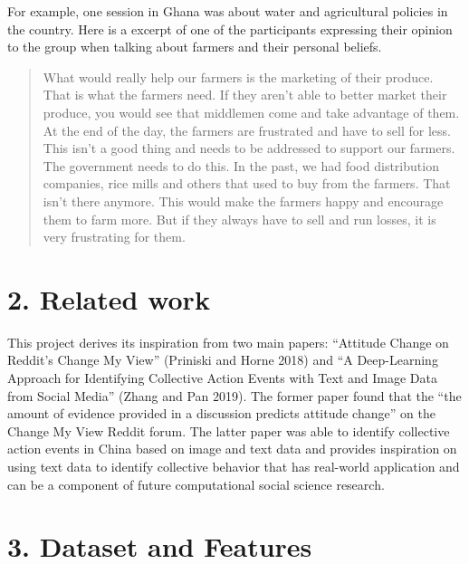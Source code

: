 \documentclass[12pt,]{article}
\begin{document}
For example, one session in Ghana was about water and agricultural
policies in the country. Here is a excerpt of one of the participants
expressing their opinion to the group when talking about farmers and
their personal beliefs.

\begin{quote}
What would really help our farmers is the marketing of their produce.
That is what the farmers need. If they aren't able to better market
their produce, you would see that middlemen come and take advantage of
them. At the end of the day, the farmers are frustrated and have to sell
for less. This isn't a good thing and needs to be addressed to support
our farmers. The government needs to do this. In the past, we had food
distribution companies, rice mills and others that used to buy from the
farmers. That isn't there anymore. This would make the farmers happy and
encourage them to farm more. But if they always have to sell and run
losses, it is very frustrating for them.
\end{quote}

\hypertarget{related-work}{%
\section{2. Related work}\label{related-work}}

This project derives its inspiration from two main papers: ``Attitude
Change on Reddit's Change My View'' (Priniski and Horne 2018) and ``A
Deep-Learning Approach for Identifying Collective Action Events with
Text and Image Data from Social Media'' (Zhang and Pan 2019). The former
paper found that the ``the amount of evidence provided in a discussion
predicts attitude change'' on the Change My View Reddit forum. The
latter paper was able to identify collective action events in China
based on image and text data and provides inspiration on using text data
to identify collective behavior that has real-world application and can
be a component of future computational social science research.

\hypertarget{dataset-and-features}{%
\section{3. Dataset and Features}\label{dataset-and-features}}
\end{document}
